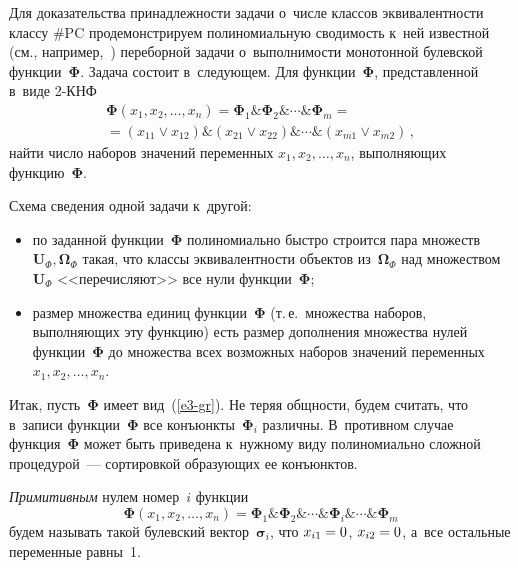 \begin{multicols}{2}
  Для доказательства принадлежности задачи о~чис\-ле классов эк\-ви\-ва\-лент\-ности 
классу $\#\mathrm{PC}$ продемонстрируем полиномиальную сводимость к~ней известной 
(см., например,~\cite{10-gr}) переборной задачи о~вы\-пол\-ни\-мости монотонной 
булевской функции~${\boldsymbol{\Phi}}$. Задача со\-сто\-ит в~следующем. Для 
функции~${\boldsymbol{\Phi}}$, 
пред\-став\-лен\-ной в~виде \mbox{2-КНФ}
  \begin{multline}
{\boldsymbol{\Phi}}\left(x_1, x_2, \ldots , x_n\right) = 
   {\boldsymbol{\Phi}}_1\&{\boldsymbol{\Phi}}_2 \& \cdots \&{\boldsymbol{\Phi}}_m ={}\\
   \!\!{}= \left(x_{11}\vee  x_{12}\right)\&\left(x_{21} \vee  x_{22}\right)\& 
   \cdots \&\left(x_{m1} \vee  x_{m2}\right)\,,\!\!
   \label{e3-gr}
   \end{multline}
   найти число наборов значений переменных $x_1, x_2, \ldots , x_n$, 
   вы\-пол\-ня\-ющих функцию~${\boldsymbol{\Phi}}$.

  Схема сведения одной задачи к~другой:
  \begin{itemize}
\item по заданной функции~${\boldsymbol{\Phi}}$ полиномиально быст\-ро строится пара 
множеств $\mathbf{U}_{\Phi}, {\boldsymbol{\Omega}}_{\Phi}$ такая, что 
классы эквивалентности объектов из~$\boldsymbol{\Omega}_{\Phi}$ над 
множеством~$\mathbf{U}_{\Phi}$ <<пе\-ре\-чис\-ля\-ют>> все нули 
функ\-ции~${\boldsymbol{\Phi}}$;
\item размер множества единиц функ\-ции~${\boldsymbol{\Phi}}$ (т.\,е.\ множества наборов, 
вы\-пол\-ня\-ющих эту функ\-цию) есть размер дополнения множества нулей 
функ\-ции~${\boldsymbol{\Phi}}$ до множества всех возможных наборов значений переменных 
$x_1, x_2, \ldots , x_n$.
  \end{itemize}
  
  Итак, пусть~${\boldsymbol{\Phi}}$ имеет вид~(\ref{e3-gr}). Не теряя общ\-ности, будем считать, 
что в~записи функции~${\boldsymbol{\Phi}}$ все конъюнкты~${\boldsymbol{\Phi}}_i$ различны. В~противном 
случае функция~${\boldsymbol{\Phi}}$ может быть приведена к~нужному виду полиномиально 
слож\-ной процедурой~--- сортировкой образующих ее конъюнктов.
  
  \textit{Примитивным} нулем номер~$i$ функции 
  $$
  {\boldsymbol{\Phi}}\left(x_1, x_2, \ldots , x_n\right) 
= {\boldsymbol{\Phi}}_1\&{\boldsymbol{\Phi}}_2\& \cdots  \&{\boldsymbol{\Phi}}_i\& 
\cdots \&{\boldsymbol{\Phi}}_m
$$ 
будем называть такой 
булевский вектор~$\boldsymbol{\sigma}_i$, что $x_{i1}\hm = 0$, $x_{i2}\hm = 0$, 
а~все остальные переменные равны~1. 
  

\end{multicols}
